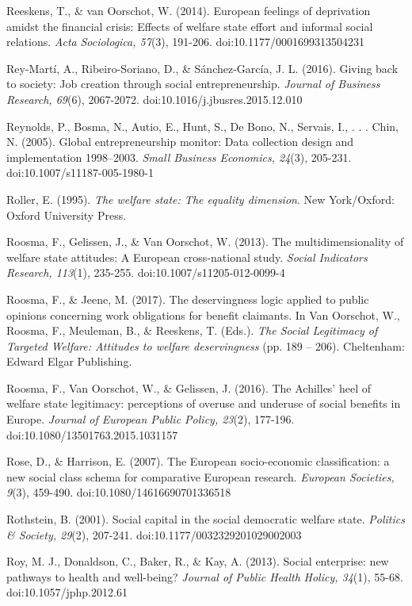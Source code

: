 \documentclass{article}
\begin{document}
Reeskens, T., \& van Oorschot, W. (2014). European feelings of deprivation amidst the financial crisis: Effects of welfare state effort and informal social relations. \emph{Acta }\emph{Sociologica}\emph{, 57}(3), 191-206. doi:10.1177/0001699313504231

Rey-Martí, A., Ribeiro-Soriano, D., \& Sánchez-García, J. L. (2016). Giving back to society: Job creation through social entrepreneurship. \emph{Journal of Business Research, 69}(6), 2067-2072. doi:10.1016/j.jbusres.2015.12.010

Reynolds, P., Bosma, N., Autio, E., Hunt, S., De Bono, N., Servais, I., . . . Chin, N. (2005). Global entrepreneurship monitor: Data collection design and implementation 1998--2003. \emph{Small Business Economics, 24}(3), 205-231. doi:10.1007/s11187-005-1980-1

Roller, E. (1995). \emph{The welfare state: The equality dimension}. New York/Oxford: Oxford University Press.

Roosma, F., Gelissen, J., \& Van Oorschot, W. (2013). The multidimensionality of welfare state attitudes: A European cross-national study. \emph{Social Indicators Research, 113}(1), 235-255. doi:10.1007/s11205-012-0099-4

Roosma, F., \& Jeene, M. (2017). The deservingness logic applied to public opinions concerning work obligations for benefit claimants. In Van Oorschot, W., Roosma, F., Meuleman, B., \& Reeskens, T. (Eds.). \emph{The Social Legitimacy of Targeted Welfare: Attitudes to welfare deservingness} (pp. 189 -- 206). Cheltenham: Edward Elgar Publishing.

Roosma, F., Van Oorschot, W., \& Gelissen, J. (2016). The Achilles' heel of welfare state legitimacy: perceptions of overuse and underuse of social benefits in Europe. \emph{Journal of European Public Policy, 23}(2), 177-196. doi:10.1080/13501763.2015.1031157

Rose, D., \& Harrison, E. (2007). The European socio-economic classification: a new social class schema for comparative European research. \emph{European Societies, 9}(3), 459-490. doi:10.1080/14616690701336518

Rothstein, B. (2001). Social capital in the social democratic welfare state. \emph{Politics \& Society, 29}(2), 207-241. doi:10.1177/0032329201029002003

Roy, M. J., Donaldson, C., Baker, R., \& Kay, A. (2013). Social enterprise: new pathways to health and well-being? \emph{Journal of Public Health }\emph{Holicy}\emph{, 34}(1), 55-68. doi:10.1057/jphp.2012.61
\end{document}
